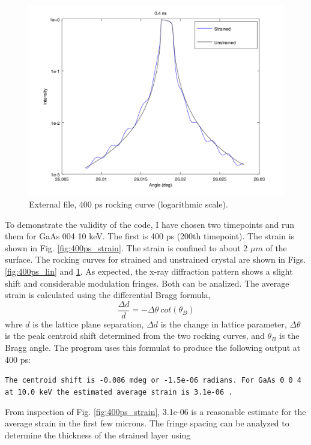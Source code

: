 \documentclass[letterpaper,11pt]{article}
\begin{document}
\begin{figure}
\begin{centering}
\includegraphics[scale=0.65]{400ps_log.png}
\caption{External file, 400 ps rocking curve (logarithmic scale).}
\label{fig:400ps_log}
\end{centering}
\end{figure}

To demonstrate the validity of the code, I have chosen two timepoints and run them for GaAs 004 10 keV.  The first is 400 ps (200th timepoint).  The strain is shown in Fig. \ref{fig:400ps_strain}.  The strain is confined to about 2 $\mu m$ of the surface.  The rocking curves for strained and unstrained crystal are shown in Figs. \ref{fig:400ps_lin} and \ref{fig:400ps_log}.  As expected, the x-ray diffraction pattern shows a slight shift and considerable modulation fringes.  Both can be analized. The average strain is calculated using the differential Bragg formula, 
\begin{equation}
\dfrac{\Delta d}{d} = -\Delta \theta \: cot(\theta_B)
\end{equation}
whre $d$ is the lattice plane separation, $\Delta d$ is the change in lattice parameter, $\Delta \theta$ is the peak centroid shift determined from the two rocking curves, and $\theta_B$ is the Bragg angle.  The program uses this formulat to produce the following output at 400 ps:  

\medskip
\noindent
\texttt{The centroid shift is -0.086 mdeg or -1.5e-06 radians. For GaAs 0 0 4 at 10.0 keV the estimated average strain is 3.1e-06 .}
\medskip

From inspection of Fig. \ref{fig:400ps_strain}, 3.1e-06 is a reasonable estimate for the average strain in the first few microns.  The fringe spacing can be analyzed to determine the thickness of the strained layer using
\end{document}

